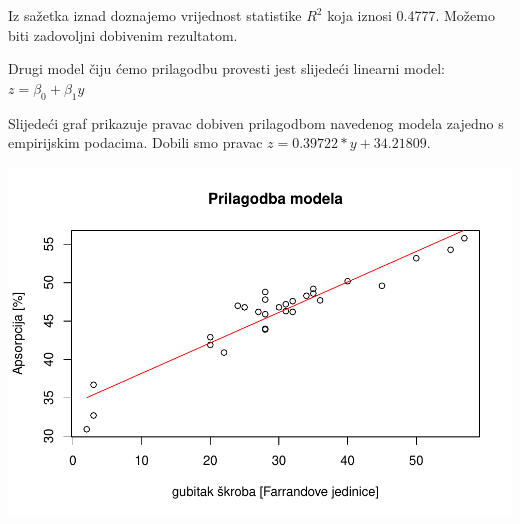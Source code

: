 \documentclass[]{article}
\newenvironment{Shaded}{\begin{snugshade}}{\end{snugshade}}
\newcommand{\KeywordTok}[1]{\textcolor[rgb]{0.13,0.29,0.53}{\textbf{{#1}}}}
\newcommand{\DataTypeTok}[1]{\textcolor[rgb]{0.13,0.29,0.53}{{#1}}}
\newcommand{\StringTok}[1]{\textcolor[rgb]{0.31,0.60,0.02}{{#1}}}
\newcommand{\NormalTok}[1]{{#1}}
\begin{document}
Iz sažetka iznad doznajemo vrijednost statistike \(R^2\) koja iznosi
0.4777. Možemo biti zadovoljni dobivenim rezultatom.

Drugi model čiju ćemo prilagodbu provesti jest slijedeći linearni model:
\(z = \beta_0 + \beta_1 y \)

\begin{Shaded}
\end{Shaded}

Slijedeći graf prikazuje pravac dobiven prilagodbom navedenog modela
zajedno s empirijskim podacima. Dobili smo pravac
\(z = 0.39722*y + 34.21809\).

\begin{Shaded}
\end{Shaded}

\includegraphics{Izvjestaj_files/figure-latex/unnamed-chunk-31-1.pdf}
\end{document}
